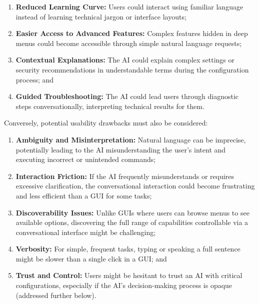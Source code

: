 \begin{enumerate}
\item \textbf{Reduced Learning Curve:} Users could interact using familiar language instead of learning technical jargon or interface layouts;

\item \textbf{Easier Access to Advanced Features:} Complex features hidden in deep menus could become accessible through simple natural language requests;

\item \textbf{Contextual Explanations:} The AI could explain complex settings or security recommendations in understandable terms during the configuration process; and

\item \textbf{Guided Troubleshooting:} The AI could lead users through diagnostic steps conversationally, interpreting technical results for them.
\end{enumerate}

Conversely, potential usability drawbacks must also be considered:

\begin{enumerate}
\item \textbf{Ambiguity and Misinterpretation:} Natural language can be imprecise, potentially leading to the AI misunderstanding the user's intent and executing incorrect or unintended commands;

\item \textbf{Interaction Friction:} If the AI frequently misunderstands or requires excessive clarification, the conversational interaction could become frustrating and less efficient than a GUI for some tasks;

\item \textbf{Discoverability Issues:} Unlike GUIs where users can browse menus to see available options, discovering the full range of capabilities controllable via a conversational interface might be challenging;

\item \textbf{Verbosity:} For simple, frequent tasks, typing or speaking a full sentence might be slower than a single click in a GUI; and

\item \textbf{Trust and Control:} Users might be hesitant to trust an AI with critical configurations, especially if the AI's decision-making process is opaque (addressed further below).
\end{enumerate}


